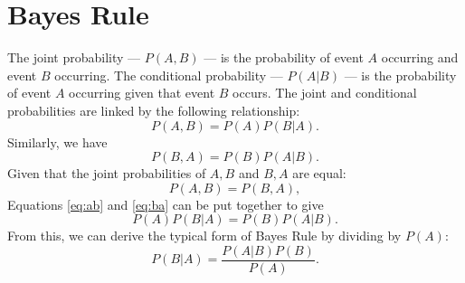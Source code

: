 \chapter{Bayes Rule}\label{ch:bayes}

The joint probability --- $P(A, B)$ --- is the probability of event $A$ occurring
and event $B$ occurring.
The conditional probability --- $P(A | B)$ --- is the probability of event $A$
occurring given that event $B$ occurs.
The joint and conditional probabilities are linked by the following relationship:
\begin{equation}\label{eq:ab}
    P(A, B) = P(A) P(B | A).
\end{equation}
Similarly, we have
\begin{equation}\label{eq:ba}
    P(B, A) = P(B) P(A | B).
\end{equation}
Given that the joint probabilities of $A, B$ and $B, A$ are equal:
\begin{equation*}
    P(A, B) = P(B, A),
\end{equation*}
Equations \ref{eq:ab} and \ref{eq:ba} can be put together to give
\begin{equation}\label{eq:pre_bayes}
    P(A) P(B | A) = P(B) P(A | B).
\end{equation}
From this, we can derive the typical form of Bayes Rule by dividing by $P(A)$:
\begin{equation}\label{eq:bayes}
    P(B | A) = \frac{P(A | B) P(B)}{P(A)}.
\end{equation}
